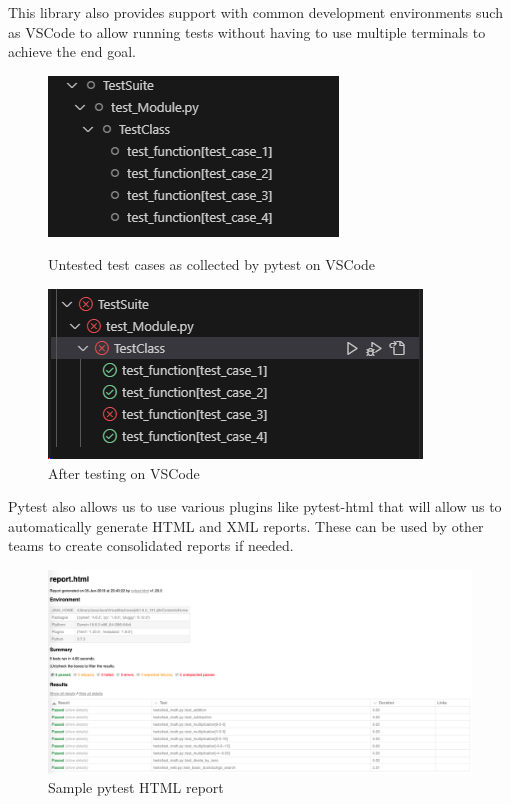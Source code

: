 This library also provides support with common development environments such as VSCode to allow running tests without having to use multiple terminals to achieve the end goal.
\begin{figure}[ht]
    \centering
    \begin{minipage}{0.45\textwidth}
        \centering
        \includegraphics{../Figures/untested.png}
        \caption{Untested test cases as collected by pytest on VSCode}
    \end{minipage}\hfill
    \begin{minipage}{0.45\textwidth}
        \centering
        \includegraphics[scale=0.9]{../Figures/tested.png}
        \caption{After testing on VSCode}
    \end{minipage}
\end{figure}

Pytest also allows us to use various plugins like pytest-html \cite{pytest-html} that will allow us to automatically generate HTML and XML reports.
These can be used by other teams to create consolidated reports if needed.
\begin{figure}[ht]
    \centering
    \includegraphics[scale=0.6]{../Figures/pytesthtml.png}
    \caption{Sample pytest HTML report \cite{htmlreport}}
\end{figure}
\newpage

